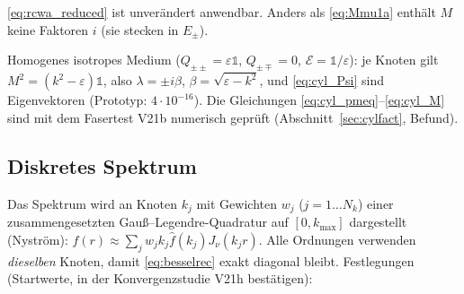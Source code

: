 \eqref{eq:rcwa_reduced} ist unverändert anwendbar. Anders als \eqref{eq:Mmu1a} enthält $M$ keine Faktoren $i$
(sie stecken in $E_\pm$).
\begin{tcolorbox}[title=Prüfpunkt (Unit-Test \texttt{test\_cyl\_propagation\_matrix})]
Homogenes isotropes Medium ($Q_{\pm\pm}=\varepsilon\mathbb 1$, $Q_{\pm\mp}=0$, $\mathcal E=\mathbb 1/\varepsilon$): je Knoten
gilt $M^2=(k^2-\varepsilon)\mathbb 1$, also $\lambda=\pm i\beta$, $\beta=\sqrt{\varepsilon-k^2}$, und \eqref{eq:cyl_Psi}
sind Eigenvektoren (Prototyp: $4\cdot10^{-16}$). Die Gleichungen \eqref{eq:cyl_pmeq}--\eqref{eq:cyl_M} sind mit dem
Fasertest V21b numerisch geprüft (Abschnitt~\ref{sec:cylfact}, Befund).
\end{tcolorbox}

\subsection{Diskretes Spektrum}\label{sec:cylgrid}
Das Spektrum wird an Knoten $k_j$ mit Gewichten $w_j$ ($j=1\dots N_k$) einer zusammengesetzten Gauß--Legendre-Quadratur
auf $[0,k_{\max}]$ dargestellt (Nyström): $f(r)\approx\sum_jw_jk_j\hat f(k_j)J_\nu(k_jr)$. Alle Ordnungen verwenden
\emph{dieselben} Knoten, damit \eqref{eq:besselrec} exakt diagonal bleibt. Festlegungen (Startwerte, in der
Konvergenzstudie V21h bestätigen):

